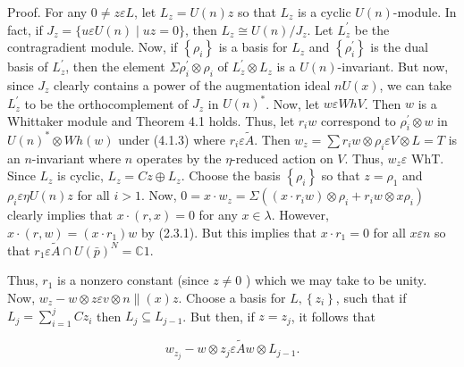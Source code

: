 \documentclass[10pt]{article}
\begin{document}
Proof. For any $0 \neq z \varepsilon L$, let $L_{z}=U(n) z$ so that $L_{z}$ is a cyclic $U(n)$-module. In fact, if $J_{z}=\{u \varepsilon U(n) \mid u z=0\}$, then $L_{z} \cong U(n) / J_{z}$. Let $L_{z}^{\prime}$ be the contragradient module. Now, if $\left\{\rho_{i}\right\}$ is a basis for $L_{z}$ and $\left\{\rho_{i}^{\prime}\right\}$ is the dual basis of $L_{z}^{\prime}$, then the element $\Sigma \rho_{i}^{\prime} \otimes \rho_{i}$ of $L_{z}^{\prime} \otimes L_{z}$ is a $U(n)$-invariant. But now, since $J_{z}$ clearly contains a power of the augmentation ideal $n U(x)$, we can take $L_{z}^{\prime}$ to be the orthocomplement of $J_{z}$ in $U(n)^{*}$. Now, let $w \varepsilon W h V$. Then $w$ is a Whittaker module and Theorem 4.1 holds. Thus, let $r_{i} w$ correspond to $\rho_{i}^{\prime} \otimes w$ in $U(n)^{*} \otimes W h(w)$ under (4.1.3) where $r_{i} \varepsilon \tilde{A}$. Then $w_{z}=\sum r_{i} w \otimes \rho_{i} \varepsilon V \otimes L=T$ is an $n$-invariant where $n$ operates by the $\eta$-reduced action on $V$. Thus, $w_{z} \varepsilon$ WhT. Since $L_{z}$ is cyclic, $L_{z}=C z \oplus L_{z}$. Choose the basis $\left\{\rho_{i}\right\}$ so that $z=\rho_{1}$ and $\rho_{i} \varepsilon \eta U(n) z$ for all $i>1$. Now, $0=x \cdot w_{z}=\Sigma\left(\left(x \cdot r_{i} w\right) \otimes \rho_{i}+r_{i} w \otimes x \rho_{i}\right)$ clearly implies that $x \cdot(r, x)=0$ for any $x \in \lambda$. However,\\
$x \cdot(r, w)=\left(x \cdot r_{1}\right) w$ by (2.3.1). But this implies that $x \cdot r_{1}=0$ for all $x \varepsilon n$ so that $r_{1} \varepsilon \tilde{A} \cap U(\bar{p})^{N}=\mathbb{C} 1$.

Thus, $r_{1}$ is a nonzero constant (since $z \neq 0$ ) which we may take to be unity. Now, $w_{z}-w \otimes z \varepsilon v \otimes n \|(x) z$. Choose a basis for $L,\left\{z_{i}\right\}$, such that if $L_{j}=\sum_{i=1}^{j} C z_{i}$ then $L_{j} \subseteq L_{j-1}$. But then, if $z=z_{j}$, it follows that


\begin{equation*}
w_{z_{j}}-w \otimes z_{j} \varepsilon \tilde{A} w \otimes L_{j-1} . \tag{4.2.3}
\end{equation*}
\end{document}
